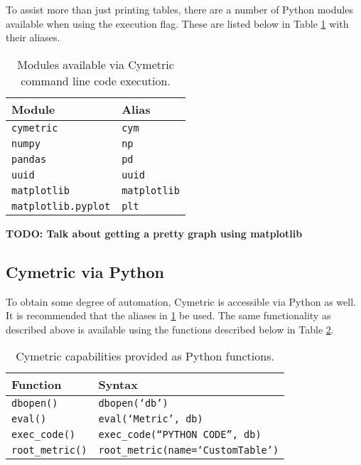 \documentclass{anstrans}
\newcommand{\TODO}[1] {{\color{red}\textbf{TODO: #1}}}
\newcommand{\code}[1]{{\color{code}\texttt{#1}}}
\begin{document}
To assist more than just printing tables, there are a number of Python modules available when using the execution  flag. These are listed below in Table \ref{tab:modules} with their aliases.

\begin{table}[htb]
  \centering
\begin{tabular}{ll}
\toprule
  Module                   & Alias \\
\midrule
  \code{cymetric}          & \code {cym} \\
  \code{numpy}             & \code{np} \\  
  \code{pandas}            & \code{pd} \\
  \code{uuid}              & \code{uuid} \\
  \code{matplotlib}        & \code{matplotlib} \\
  \code{matplotlib.pyplot} & \code{plt} \\
\bottomrule
\end{tabular}
  \caption{Modules available via Cymetric command line code execution.}
  \label{tab:modules}
\end{table}

\TODO{Talk about getting a pretty graph using matplotlib}

\subsection{Cymetric via Python}
To obtain some degree of automation, Cymetric is accessible via Python as well. It is recommended that the aliases in \ref{tab:modules} be used. The same functionality as described above is available using the functions described below in Table \ref{tab:pyfunc}.

\begin{table}[htb]
  \centering
\begin{tabular}{ll}
\toprule
  Function           & Syntax                 \\
\midrule 
  \code{dbopen()}    & \code{dbopen(`db')}         \\
  \code{eval()}      & \code{eval(`Metric', db)}   \\
  \code{exec\_code()} & \code{exec\_code(``PYTHON CODE'', db)}  \\ 
  \code{root\_metric()} & \code{root\_metric(name=`CustomTable')}  \\
\bottomrule
\end{tabular}
  \caption{Cymetric capabilities provided as Python functions.}
  \label{tab:pyfunc}
\end{table} 
\end{document}

